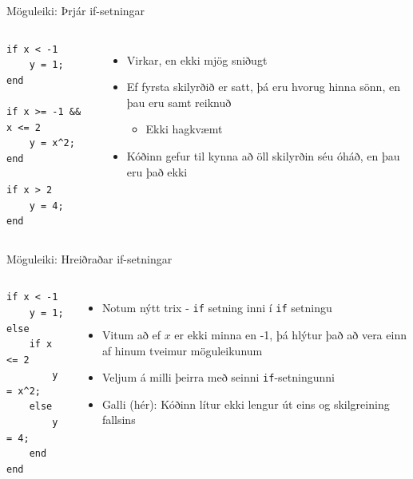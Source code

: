 \documentclass{beamer}
\begin{document}
\begin{frame}[fragile]{Möguleiki: Þrjár if-setningar}
\begin{columns}
\begin{verbatim}
if x < -1
    y = 1;
end

if x >= -1 && x <= 2
    y = x^2;
end

if x > 2
    y = 4;
end
\end{verbatim}
\begin{itemize}
 \item Virkar, en ekki mjög sniðugt
 \item Ef fyrsta skilyrðið er satt, þá eru hvorug hinna sönn, en þau eru samt reiknuð
 \begin{itemize}
  \item Ekki hagkvæmt
 \end{itemize}
 \item Kóðinn gefur til kynna að öll skilyrðin séu óháð, en þau eru það ekki
\end{itemize}
\end{columns}
\end{frame}

\begin{frame}[fragile]{Möguleiki: Hreiðraðar if-setningar}
\begin{columns}
\begin{verbatim}
if x < -1
    y = 1;
else
    if x <= 2
        y = x^2;
    else
        y = 4;
    end
end
\end{verbatim}
\begin{itemize}
 \item Notum nýtt trix - \texttt{if} setning inni í \texttt{if} setningu
 \item Vitum að ef $x$ er ekki minna en -1, þá hlýtur það að vera einn af hinum tveimur möguleikunum
 \item Veljum á milli þeirra með seinni \texttt{if}-setningunni
 \item Galli (hér): Kóðinn lítur ekki lengur út eins og skilgreining fallsins
\end{itemize}
\end{columns}
\end{frame}
\end{document}
